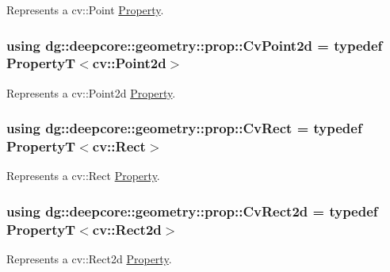 Represents a {\ttfamily cv\+::\+Point} \hyperlink{classdg_1_1deepcore_1_1_property}{Property}. 

\subsubsection[{\texorpdfstring{Cv\+Point2d}{CvPoint2d}}]{\setlength{\rightskip}{0pt plus 5cm}using {\bf dg\+::deepcore\+::geometry\+::prop\+::\+Cv\+Point2d} = typedef PropertyT$<$cv\+::\+Point2d$>$}\hypertarget{group___geometry_properties_ga4125b4549e9900f3592c85733b223966}{}\label{group___geometry_properties_ga4125b4549e9900f3592c85733b223966}


Represents a {\ttfamily cv\+::\+Point2d} \hyperlink{classdg_1_1deepcore_1_1_property}{Property}. 

\subsubsection[{\texorpdfstring{Cv\+Rect}{CvRect}}]{\setlength{\rightskip}{0pt plus 5cm}using {\bf dg\+::deepcore\+::geometry\+::prop\+::\+Cv\+Rect} = typedef PropertyT$<$cv\+::\+Rect$>$}\hypertarget{group___geometry_properties_ga650cb626fb0e3ea63706df17b8e0e59d}{}\label{group___geometry_properties_ga650cb626fb0e3ea63706df17b8e0e59d}


Represents a {\ttfamily cv\+::\+Rect} \hyperlink{classdg_1_1deepcore_1_1_property}{Property}. 

\subsubsection[{\texorpdfstring{Cv\+Rect2d}{CvRect2d}}]{\setlength{\rightskip}{0pt plus 5cm}using {\bf dg\+::deepcore\+::geometry\+::prop\+::\+Cv\+Rect2d} = typedef PropertyT$<$cv\+::\+Rect2d$>$}\hypertarget{group___geometry_properties_ga7009c5f5d32fd1adfe3e034126b527cb}{}\label{group___geometry_properties_ga7009c5f5d32fd1adfe3e034126b527cb}


Represents a {\ttfamily cv\+::\+Rect2d} \hyperlink{classdg_1_1deepcore_1_1_property}{Property}. 

